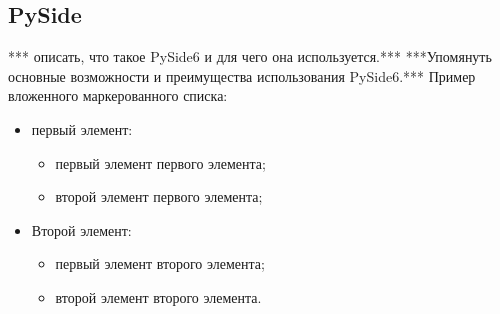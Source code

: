 \subsection{\label{subsec:ch01/sec02/sub02}PySide}
*** описать, что такое PySide6 и для чего она используется.***
***Упомянуть основные возможности и преимущества использования PySide6.***
Пример вложенного маркерованного списка:
\begin{itemize}
\item первый элемент:
\begin{itemize}
\item первый элемент первого элемента;
\item второй элемент первого элемента;
\end{itemize}
\item Второй элемент:
\begin{itemize}
\item первый элемент второго элемента;
\item второй элемент второго элемента.
\end{itemize}
\end{itemize}

